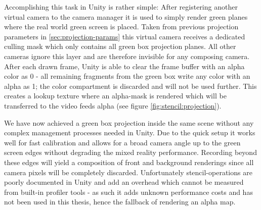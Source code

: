Accomplishing this task in Unity is rather simple: After registering another 
virtual camera to the camera manager it is used to simply render green planes 
where the real world green screen is placed. Taken from previous projection 
parameters in \ref{sec:projection-params} this virtual camera receives a 
dedicated culling mask which only contains all green box projection planes. All 
other cameras ignore this layer and are therefore invisible for any composing 
camera. After each drawn frame, Unity is able to clear the frame buffer with an 
alpha color as 0 - all remaining fragments from the green box write any color 
with an alpha as 1; the color compartment is discarded and will not be used 
further. This creates a lookup texture where an alpha-mask is rendered which 
will be transferred to the video feeds alpha (see figure 
\ref{fig:stencil:projection}).

We have now achieved a green box projection inside the same scene without any 
complex management processes needed in Unity. Due to the quick setup it works 
well for fast calibration and allows for a broad camera angle up to the green 
screen edges without degrading the mixed reality performance. Recording beyond 
these edges will yield a composition of front and background renderings 
since all camera pixels will be completely discarded.
\newline
Unfortunately stencil-operations are poorly documented in Unity and add an 
overhead which cannot be measured from built-in profiler tools - as such it 
adds unknown performance costs and has not been used in this thesis, hence the 
fallback of rendering an alpha map.